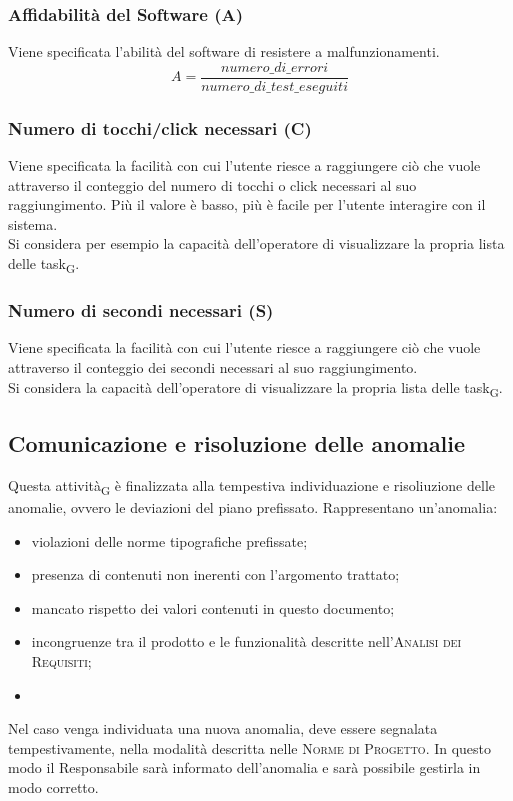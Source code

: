 \subsubsection{Affidabilità del Software (A)}
Viene specificata l'abilità del software di resistere a malfunzionamenti.
\[A = \frac{numero\_di\_errori}{numero\_di\_test\_eseguiti}\]

\subsubsection{Numero di tocchi/click necessari (C)}
Viene specificata la facilità con cui l'utente riesce a raggiungere ciò che vuole attraverso il conteggio del numero di tocchi o click necessari al suo raggiungimento. Più il valore è basso, più è facile per l'utente interagire con il sistema.\\
Si considera per esempio la capacità dell'operatore di visualizzare la propria lista delle task\textsubscript{G}.

\subsubsection{Numero di secondi necessari (S)}
Viene specificata la facilità con cui l'utente riesce a raggiungere ciò che vuole attraverso il conteggio dei secondi necessari al suo raggiungimento.\\
Si considera la capacità dell'operatore di visualizzare la propria lista delle task\textsubscript{G}.


\subsection{Comunicazione e risoluzione delle anomalie}

Questa attività\textsubscript{G} è finalizzata alla tempestiva individuazione e risoliuzione delle anomalie, ovvero le deviazioni del piano prefissato. Rappresentano un'anomalia:
\begin{itemize}
    \item violazioni delle norme tipografiche prefissate;
    \item presenza di contenuti non inerenti con l'argomento trattato;
    \item mancato rispetto dei valori contenuti in questo documento;
    \item incongruenze tra il prodotto e le funzionalità descritte nell'\textsc{Analisi dei Requisiti};
    \item 
\end{itemize}
Nel caso venga individuata una nuova anomalia, deve essere segnalata tempestivamente, nella modalità descritta nelle \textsc{Norme di Progetto}. In questo modo il Responsabile sarà informato dell'anomalia e sarà possibile gestirla in modo corretto.
